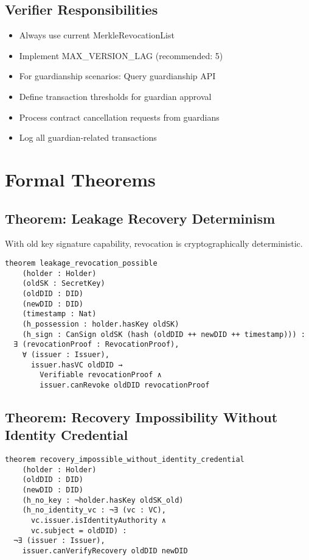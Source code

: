 \subsection{Verifier Responsibilities}

\begin{itemize}
  \item Always use current MerkleRevocationList
  \item Implement MAX\_VERSION\_LAG (recommended: 5)
  \item For guardianship scenarios: Query guardianship API
  \item Define transaction thresholds for guardian approval
  \item Process contract cancellation requests from guardians
  \item Log all guardian-related transactions
\end{itemize}

\section{Formal Theorems}

\subsection{Theorem: Leakage Recovery Determinism}

With old key signature capability, revocation is cryptographically deterministic.

\begin{verbatim}
theorem leakage_revocation_possible
    (holder : Holder)
    (oldSK : SecretKey)
    (oldDID : DID)
    (newDID : DID)
    (timestamp : Nat)
    (h_possession : holder.hasKey oldSK)
    (h_sign : CanSign oldSK (hash (oldDID ++ newDID ++ timestamp))) :
  ∃ (revocationProof : RevocationProof),
    ∀ (issuer : Issuer),
      issuer.hasVC oldDID →
        Verifiable revocationProof ∧
        issuer.canRevoke oldDID revocationProof
\end{verbatim}

\subsection{Theorem: Recovery Impossibility Without Identity Credential}

\begin{verbatim}
theorem recovery_impossible_without_identity_credential
    (holder : Holder)
    (oldDID : DID)
    (newDID : DID)
    (h_no_key : ¬holder.hasKey oldSK_old)
    (h_no_identity_vc : ¬∃ (vc : VC),
      vc.issuer.isIdentityAuthority ∧
      vc.subject = oldDID) :
  ¬∃ (issuer : Issuer),
    issuer.canVerifyRecovery oldDID newDID
\end{verbatim}


